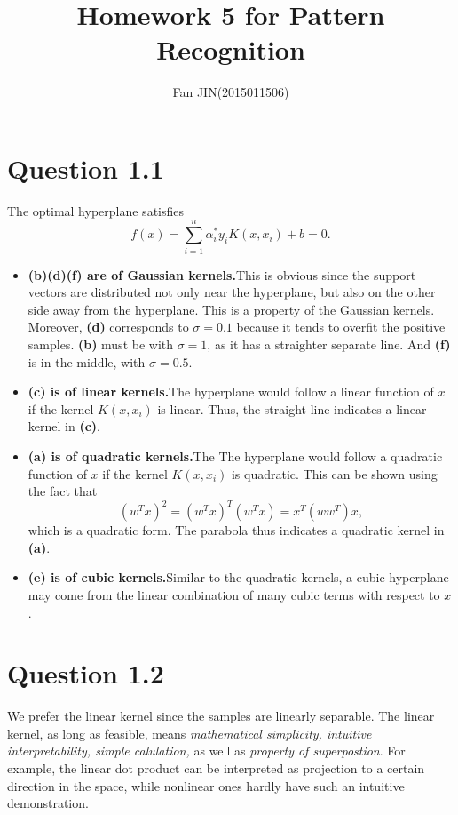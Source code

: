 \documentclass{article}
\begin{document}
\title{\textsf{Homework 5 for Pattern Recognition}}
\author{Fan JIN\quad (2015011506)}
\maketitle

\section*{Question 1.1}
{
    The optimal hyperplane satisfies $$f(x) = \sum_{i=1}^{n}{\alpha_i^{*} y_i K(x, x_i)} + b = 0.$$
    \begin{itemize}
        \item \textbf{(b)(d)(f) are of Gaussian kernels.}\quad This is obvious since the support vectors are distributed not only near the hyperplane, but also on the other side away from the hyperplane. This is a property of the Gaussian kernels. Moreover, \textbf{(d)} corresponds to $\sigma=0.1$ because it tends to overfit the positive samples. \textbf{(b)} must be with $\sigma=1$, as it has a straighter separate line. And \textbf{(f)} is in the middle, with $\sigma=0.5$.

        \item \textbf{(c) is of linear kernels.}\quad The hyperplane would follow a linear function of $x$ if the kernel $K(x, x_i)$ is linear. Thus, the straight line indicates a linear kernel in \textbf{(c)}.

        \item \textbf{(a) is of quadratic kernels.}\quad The The hyperplane would follow a quadratic function of $x$ if the kernel $K(x, x_i)$ is quadratic. This can be shown using the fact that $$(w^T x)^2 = (w^T x)^T (w^T x) = x^T (w w^T) x,$$ which is a quadratic form. The parabola thus indicates a quadratic kernel in \textbf{(a)}.

        \item \textbf{(e) is of cubic kernels.}\quad Similar to the quadratic kernels, a cubic hyperplane may come from the linear combination of many cubic terms with respect to $x$.
    \end{itemize}
}

\section*{Question 1.2}
{
    We prefer the linear kernel since the samples are linearly separable. The linear kernel, as long as feasible, means \emph{mathematical simplicity, intuitive interpretability, simple calulation,} as well as \emph{property of superpostion}. For example, the linear dot product can be interpreted as projection to a certain direction in the space, while nonlinear ones hardly have such an intuitive demonstration. 
}
\end{document}
